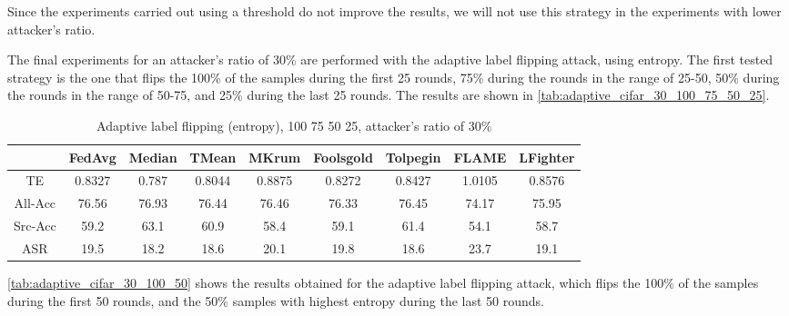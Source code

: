 Since the experiments carried out using a threshold do not improve the results, we will not use this strategy in the experiments with lower attacker's ratio.

The final experiments for an attacker's ratio of 30\% are performed with the adaptive label flipping attack, using entropy. The first tested strategy is the one that flips the 100\% of the samples during the first 25 rounds, 75\% during the rounds in the range of 25-50, 50\% during the rounds in the range of 50-75, and 25\% during the last 25 rounds. The results are shown in \autoref{tab:adaptive_cifar_30_100_75_50_25}.

\begin{table}[h!]
        \centering
        \small
        \begin{adjustbox}{center}
        \begin{tabular}{|c|c|c|c|c|c|c|c|c|}
            \hline
            & FedAvg & Median & TMean & MKrum & Foolsgold & Tolpegin & FLAME & LFighter \\
            \hline
            TE & 0.8327 & 0.787 & 0.8044 & 0.8875 & 0.8272 & 0.8427 & 1.0105 & 0.8576 \\
            \hline
            All-Acc & 76.56 & 76.93 & 76.44 & 76.46 & 76.33 & 76.45 & 74.17 & 75.95 \\
            \hline
            Src-Acc & 59.2 & 63.1 & 60.9 & 58.4 & 59.1 & 61.4 & 54.1 & 58.7 \\
            \hline
            ASR & 19.5 & 18.2 & 18.6 & 20.1 & 19.8 & 18.6 & 23.7 & 19.1 \\
            \hline
        \end{tabular}
        \end{adjustbox}
        \caption{Adaptive label flipping (entropy), 100 75 50 25, attacker's ratio of 30\%}
        \label{tab:adaptive_cifar_30_100_75_50_25}
    \end{table}
    
\autoref{tab:adaptive_cifar_30_100_50} shows the results obtained for the adaptive label flipping attack, which flips the 100\% of the samples during the first 50 rounds, and the 50\% samples with highest entropy during the last 50 rounds.

